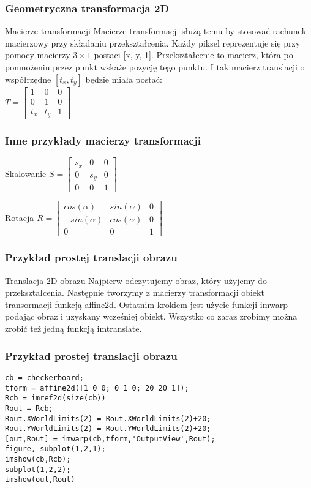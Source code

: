 \documentclass{beamer}
\begin{document}
\begin{frame}
\frametitle{Geometryczna transformacja 2D}
\begin{block}{Macierze transformacji}
Macierze transformacji służą temu by stosować rachunek macierzowy przy składaniu przekształcenia. Każdy piksel reprezentuje się przy pomocy macierzy $3 \times 1$ postaci [x, y, 1]. Przekształcenie to macierz, która po pomnożeniu przez punkt wskaże pozycję tego punktu. I tak macierz translacji o współrzędne $[t_x, t_y]$ będzie miała postać: \\
\centering
$T = \begin{bmatrix}
	1 & 0 & 0\\
	0 & 1 & 0\\
	t_x & t_y & 1
\end{bmatrix}$
\end{block}
\end{frame}

\begin{frame}
\frametitle{Inne przykłady macierzy transformacji}
\begin{block}{Skalowanie}
\centering
$S = \begin{bmatrix}
	s_x & 0 & 0\\
	0 & s_y & 0\\
	0 & 0 & 1
\end{bmatrix}$
\end{block}
\begin{block}{Rotacja}
\centering
$R = \begin{bmatrix}
	cos(\alpha) & sin(\alpha) & 0\\
	-sin(\alpha) & cos(\alpha) & 0\\
	0 & 0 & 1
\end{bmatrix}$
\end{block}
\end{frame}

\begin{frame}[fragile]
\frametitle{Przykład prostej translacji obrazu}
\begin{block}{Translacja 2D obrazu}
Najpierw odczytujemy obraz, który użyjemy do przekształcenia. Następnie tworzymy z macierzy transformacji obiekt transormacji funkcją affine2d. Ostatnim krokiem jest użycie funkcji imwarp podając obraz i uzyskany wcześniej obiekt.
Wszystko co zaraz zrobimy można zrobić też jedną funkcją imtranslate.
\end{block}

\end{frame}

\begin{frame}[fragile]
\frametitle{Przykład prostej translacji obrazu}
\begin{example}
\begin{lstlisting}
cb = checkerboard;
tform = affine2d([1 0 0; 0 1 0; 20 20 1]);
Rcb = imref2d(size(cb))
Rout = Rcb;
Rout.XWorldLimits(2) = Rout.XWorldLimits(2)+20;
Rout.YWorldLimits(2) = Rout.YWorldLimits(2)+20;
[out,Rout] = imwarp(cb,tform,'OutputView',Rout);
figure, subplot(1,2,1);
imshow(cb,Rcb);
subplot(1,2,2);
imshow(out,Rout)
\end{lstlisting}
\end{example}
\end{frame}
\end{document}
